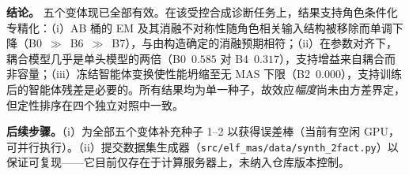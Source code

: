 \documentclass[10pt]{article}
\begin{document}
\noindent\textbf{结论。} 五个变体现已全部有效。在该受控合成诊断任务上，结果支持角色条件化专精化：（i）AB 桶的 EM 及其消融不对称性随角色相关输入结构被移除而单调下降（B0~$\gg$~B6~$\gg$~B7），与由构造确定的消融预期相符；（ii）在参数对齐下，耦合模型几乎是单头模型的两倍（B0~$0.585$ 对 B4~$0.317$），支持增益来自耦合而非容量；（iii）冻结智能体变换使性能坍缩至无 MAS 下限（B2~$0.000$），支持训练后的智能体残差是必要的。所有结果均为单一种子，故效应\emph{幅度}尚未由方差界定，但定性排序在四个独立对照中一致。

\noindent\textbf{后续步骤。}（i）为全部五个变体补充种子 1--2 以获得误差棒（当前有空闲 GPU，可并行执行）。（ii）提交数据集生成器（\texttt{src/elf\_mas/data/synth\_2fact.py}）以保证可复现——它目前仅存在于计算服务器上，未纳入仓库版本控制。
\end{document}

